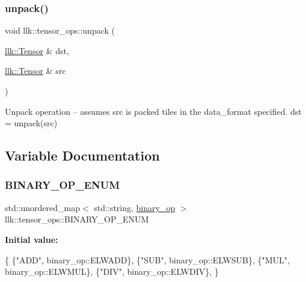 \subsubsection{\texorpdfstring{unpack()}{unpack()}}
{\footnotesize\ttfamily void llk\+::tensor\+\_\+ops\+::unpack (\begin{DoxyParamCaption}\item[{\hyperlink{classllk_1_1Tensor}{llk\+::\+Tensor} \&}]{dst,  }\item[{\hyperlink{classllk_1_1Tensor}{llk\+::\+Tensor} \&}]{src }\end{DoxyParamCaption})}



Unpack operation -- assumes src is packed tiles in the data\+\_\+format specified. dst = unpack(src) 



\subsection{Variable Documentation}
\mbox{\label{namespacellk_1_1tensor__ops_a523bf0b48b957ace6607a472ae9dda07}} 
\subsubsection{\texorpdfstring{B\+I\+N\+A\+R\+Y\+\_\+\+O\+P\+\_\+\+E\+N\+UM}{BINARY\_OP\_ENUM}}
{\footnotesize\ttfamily std\+::unordered\+\_\+map$<$ std\+::string, \hyperlink{namespacellk_1_1tensor__ops_a255b8a4e49bc956c2731c62bf613c0f8}{binary\+\_\+op} $>$ llk\+::tensor\+\_\+ops\+::\+B\+I\+N\+A\+R\+Y\+\_\+\+O\+P\+\_\+\+E\+N\+UM}

{\bfseries Initial value\+:}
\begin{DoxyCode}
\{
    \{\textcolor{stringliteral}{"ADD"}, binary\_op::ELWADD\},
    \{\textcolor{stringliteral}{"SUB"}, binary\_op::ELWSUB\},
    \{\textcolor{stringliteral}{"MUL"}, binary\_op::ELWMUL\},
    \{\textcolor{stringliteral}{"DIV"}, binary\_op::ELWDIV\},
\}
\end{DoxyCode}
\mbox{\label{namespacellk_1_1tensor__ops_a309a5d53895adf0e1e1f4cad08533c95}} 
